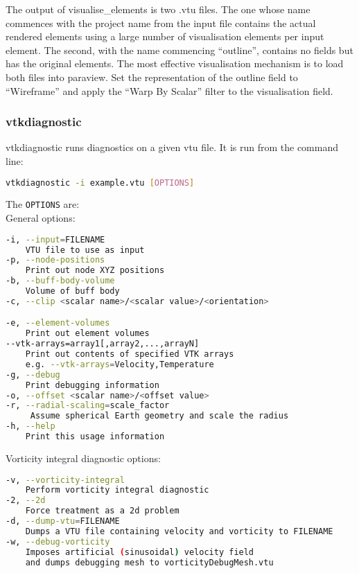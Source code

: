 The output of visualise\_elements is two .vtu files. The one whose name
commences with the project name from the input file contains the actual
rendered elements using a large number of visualisation elements per input
element. The second, with the name commencing ``outline'', contains no
fields but has the original elements. The most effective visualisation
mechanism is to load both files into paraview. Set the representation of the
outline field to ``Wireframe'' and apply the ``Warp By Scalar'' filter to
the visualisation field.


\subsubsection{vtkdiagnostic}
\label{sec:vtkdiagnostic}
vtkdiagnostic runs diagnostics on a given vtu file. It is run from the command line:
\begin{lstlisting}[language = Bash]
vtkdiagnostic -i example.vtu [OPTIONS]
\end{lstlisting}

The \lstinline[language = Bash]+OPTIONS+ are: \\
General options:
\begin{lstlisting}[language = Bash]
-i, --input=FILENAME
	VTU file to use as input
-p, --node-positions
	Print out node XYZ positions
-b, --buff-body-volume
	Volume of buff body
-c, --clip <scalar name>/<scalar value>/<orientation>

-e, --element-volumes
	Print out element volumes
--vtk-arrays=array1[,array2,...,arrayN]
	Print out contents of specified VTK arrays
	e.g. --vtk-arrays=Velocity,Temperature
-g, --debug
	Print debugging information
-o, --offset <scalar name>/<offset value>
-r, --radial-scaling=scale_factor
	 Assume spherical Earth geometry and scale the radius
-h, --help
	Print this usage information
\end{lstlisting}
Vorticity integral diagnostic options:
\begin{lstlisting}[language = Bash]
-v, --vorticity-integral
	Perform vorticity integral diagnostic
-2, --2d
	Force treatment as a 2d problem
-d, --dump-vtu=FILENAME
	Dumps a VTU file containing velocity and vorticity to FILENAME
-w, --debug-vorticity
	Imposes artificial (sinusoidal) velocity field
	and dumps debugging mesh to vorticityDebugMesh.vtu
\end{lstlisting}


